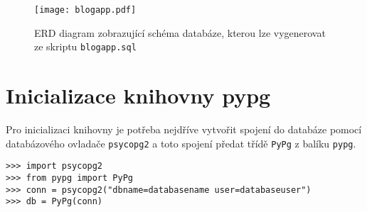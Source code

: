 \documentclass[11pt]{article}
\begin{document}
\clearpage
\begin{figure}[h!]
    \centering
    \texttt{[image: blogapp.pdf]}
    \caption{ERD diagram zobrazující schéma databáze, kterou lze vygenerovat ze skriptu \lstinline[style=inline]|blogapp.sql|}
    \label{fig:ERD}
\end{figure}

\section{Inicializace knihovny pypg}

Pro inicializaci knihovny je potřeba nejdříve vytvořit spojení do databáze pomocí databázového ovladače \lstinline[style=inline]|psycopg2| a toto spojení předat třídě \lstinline[style=inline]|PyPg| z balíku \lstinline[style=inline]|pypg|.

\begin{lstlisting}[style=python]
>>> import psycopg2
>>> from pypg import PyPg
>>> conn = psycopg2("dbname=databasename user=databaseuser")
>>> db = PyPg(conn)
\end{lstlisting}
\end{document}
